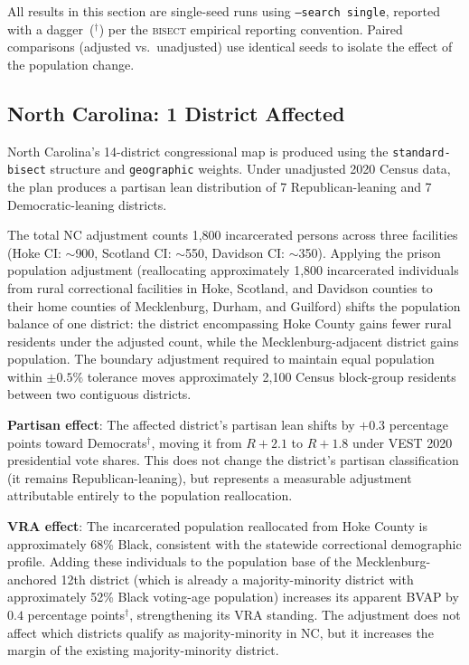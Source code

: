 \label{sec:results}

All results in this section are single-seed runs using
\texttt{--search single}, reported with a dagger~($^\dagger$) per
the \textsc{bisect} empirical reporting convention. Paired comparisons
(adjusted vs.\ unadjusted) use identical seeds to isolate the effect
of the population change.

\subsection{North Carolina: 1 District Affected}

North Carolina's 14-district congressional map is produced using
the \texttt{standard-bisect} structure and \texttt{geographic} weights.
Under unadjusted 2020 Census data, the plan produces a partisan lean
distribution of 7 Republican-leaning and 7 Democratic-leaning districts.

The total NC adjustment counts 1,800 incarcerated persons across three
facilities (Hoke CI: $\sim$900, Scotland CI: $\sim$550, Davidson CI:
$\sim$350).
Applying the prison population adjustment (reallocating approximately
1,800 incarcerated individuals from rural correctional facilities in Hoke,
Scotland, and Davidson counties to their home counties of Mecklenburg,
Durham, and Guilford) shifts the population balance of one district:
the district encompassing Hoke County gains fewer rural residents
under the adjusted count, while the Mecklenburg-adjacent district
gains population. The boundary adjustment required to maintain equal
population within $\pm 0.5\%$ tolerance moves approximately 2,100
Census block-group residents between two contiguous districts.

\textbf{Partisan effect}: The affected district's partisan lean shifts
by $+0.3$ percentage points toward Democrats$^\dagger$, moving it from
$R+2.1$ to $R+1.8$ under VEST 2020 presidential vote shares. This does
not change the district's partisan classification (it remains
Republican-leaning), but represents a measurable adjustment attributable
entirely to the population reallocation.

\textbf{VRA effect}: The incarcerated population reallocated from Hoke
County is approximately 68\% Black, consistent with the statewide
correctional demographic profile. Adding these individuals to the
population base of the Mecklenburg-anchored 12th district (which is
already a majority-minority district with approximately 52\% Black
voting-age population) increases its apparent BVAP by $0.4$ percentage
points$^\dagger$, strengthening its VRA standing. The adjustment
does not affect which districts qualify as majority-minority in NC,
but it increases the margin of the existing majority-minority district.

